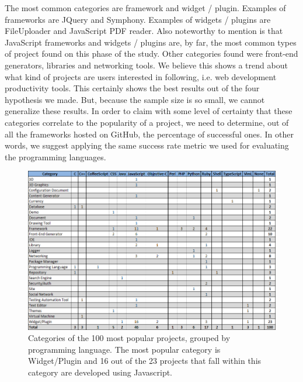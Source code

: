 The most common categories are framework and widget / plugin. Examples of frameworks are JQuery and Symphony. Examples of widgets / plugins are FileUploader and JavaScript PDF reader. Also noteworthy to mention is that JavaScript frameworks and widgets / plugins are, by far, the most common types of project found on this phase of the study. Other categories found were front-end generators, libraries and networking tools. We believe this shows a trend about what kind of projects are users interested in following, i.e. web development productivity tools. This certainly shows the best results out of the four hypothesis we made. But, because the sample size is so small, we cannot generalize these results. In order to claim with some level of certainty that these categories correlate to the popularity of a project, we need to determine, out of all the frameworks hosted on GitHub, the percentage of successful ones. In other words, we suggest applying the same success rate metric we used for evaluating the programming languages.
\begin{figure}[ht]
	\centering
	\includegraphics[width=\textwidth]{./img/categories.png}
	\caption{Categories of the 100 most popular projects, grouped by programming language. The most popular category is Widget/Plugin and 16 out of the 23 projects that fall within this category are developed using Javascript.}
	\label{fig:categories}
\end{figure}
